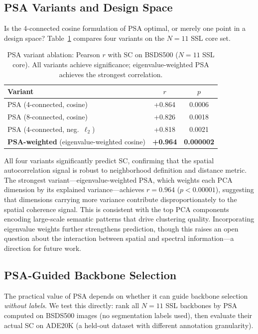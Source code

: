 \documentclass[runningheads]{llncs}
\begin{document}
\subsection{PSA Variants and Design Space}
\label{sec:psa_variants}

Is the 4-connected cosine formulation of PSA optimal, or merely one point in a design space? Table~\ref{tab:psa_variants} compares four variants on the $N=11$ SSL core set.

\begin{table}[H]
\centering
\caption{PSA variant ablation: Pearson $r$ with SC on BSDS500 ($N=11$ SSL core). All variants achieve significance; eigenvalue-weighted PSA achieves the strongest correlation.}
\label{tab:psa_variants}
\small
\begin{tabular}{lcc}
\toprule
Variant & $r$ & $p$ \\
\midrule
PSA (4-connected, cosine) & +0.864 & 0.0006 \\
PSA (8-connected, cosine) & +0.826 & 0.0018 \\
PSA (4-connected, neg.~$\ell_2$) & +0.818 & 0.0021 \\
\textbf{PSA-weighted} (eigenvalue-weighted cosine) & \textbf{+0.964} & \textbf{0.000002} \\
\bottomrule
\end{tabular}
\vspace{-10pt}
\end{table}

All four variants significantly predict SC, confirming that the spatial autocorrelation signal is robust to neighborhood definition and distance metric. The strongest variant---eigenvalue-weighted PSA, which weights each PCA dimension by its explained variance---achieves $r=0.964$ ($p<0.00001$), suggesting that dimensions carrying more variance contribute disproportionately to the spatial coherence signal. This is consistent with the top PCA components encoding large-scale semantic patterns that drive clustering quality. Incorporating eigenvalue weights further strengthens prediction, though this raises an open question about the interaction between spatial and spectral information---a direction for future work.

\subsection{PSA-Guided Backbone Selection}
\label{sec:psa_selection}

The practical value of PSA depends on whether it can guide backbone selection \emph{without labels}. We test this directly: rank all $N=11$ SSL backbones by PSA computed on BSDS500 images (no segmentation labels used), then evaluate their actual SC on ADE20K (a held-out dataset with different annotation granularity).
\end{document}
